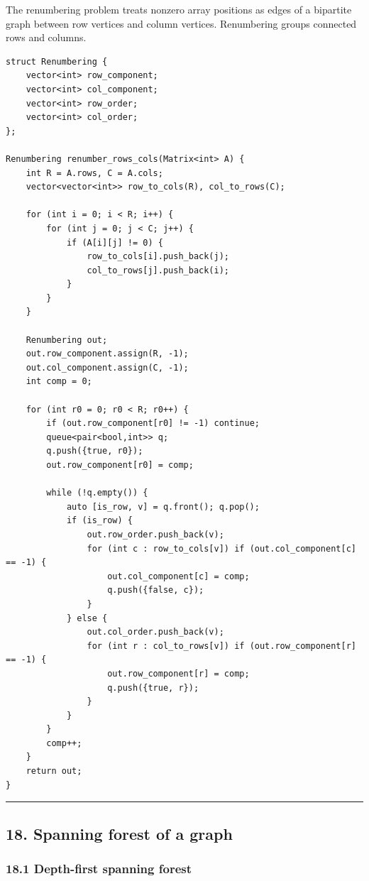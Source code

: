 \documentclass[11pt]{article}
\begin{document}
The renumbering problem treats nonzero array positions as edges of a bipartite graph between row vertices and column vertices. Renumbering groups connected rows and columns.

\begin{verbatim}
struct Renumbering {
    vector<int> row_component;
    vector<int> col_component;
    vector<int> row_order;
    vector<int> col_order;
};

Renumbering renumber_rows_cols(Matrix<int> A) {
    int R = A.rows, C = A.cols;
    vector<vector<int>> row_to_cols(R), col_to_rows(C);

    for (int i = 0; i < R; i++) {
        for (int j = 0; j < C; j++) {
            if (A[i][j] != 0) {
                row_to_cols[i].push_back(j);
                col_to_rows[j].push_back(i);
            }
        }
    }

    Renumbering out;
    out.row_component.assign(R, -1);
    out.col_component.assign(C, -1);
    int comp = 0;

    for (int r0 = 0; r0 < R; r0++) {
        if (out.row_component[r0] != -1) continue;
        queue<pair<bool,int>> q;
        q.push({true, r0});
        out.row_component[r0] = comp;

        while (!q.empty()) {
            auto [is_row, v] = q.front(); q.pop();
            if (is_row) {
                out.row_order.push_back(v);
                for (int c : row_to_cols[v]) if (out.col_component[c] == -1) {
                    out.col_component[c] = comp;
                    q.push({false, c});
                }
            } else {
                out.col_order.push_back(v);
                for (int r : col_to_rows[v]) if (out.row_component[r] == -1) {
                    out.row_component[r] = comp;
                    q.push({true, r});
                }
            }
        }
        comp++;
    }
    return out;
}
\end{verbatim}

\begin{center}\rule{0.5\linewidth}{0.5pt}\end{center}

\subsection{18. Spanning forest of a graph}\label{spanning-forest-of-a-graph}

\subsubsection{18.1 Depth-first spanning forest}\label{depth-first-spanning-forest}
\end{document}
